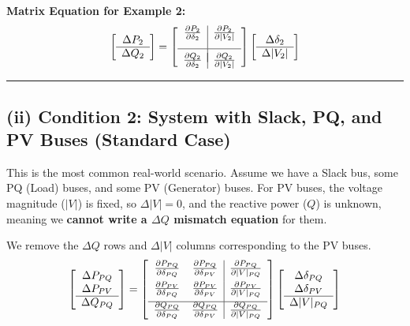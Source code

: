 \documentclass[11pt]{article}
\begin{document}
\textbf{Matrix Equation for Example 2:}
\begin{equation*}
    \left[ \begin{array}{c} 
    \Delta P_2 \\ \hline
    \Delta Q_2
    \end{array} \right] 
    = 
    \left[ \begin{array}{c | c} 
    \frac{\partial P_2}{\partial \delta_2} & \frac{\partial P_2}{\partial |V_2|} \\[0.3cm] \hline \\[-0.3cm]
    \frac{\partial Q_2}{\partial \delta_2} & \frac{\partial Q_2}{\partial |V_2|}
    \end{array} \right]
    \left[ \begin{array}{c} 
    \Delta \delta_2 \\ \hline
    \Delta |V_2|
    \end{array} \right]
\end{equation*}

\vspace{0.5cm}
\hrule

\subsection*{(ii) Condition 2: System with Slack, PQ, and PV Buses (Standard Case)}
This is the most common real-world scenario. Assume we have a Slack bus, some PQ (Load) buses, and some PV (Generator) buses. 
For PV buses, the voltage magnitude ($|V|$) is fixed, so $\Delta |V| = 0$, and the reactive power ($Q$) is unknown, meaning we \textbf{cannot write a $\Delta Q$ mismatch equation} for them.
%
\begin{stepbox}
We remove the $\Delta Q$ rows and $\Delta |V|$ columns corresponding to the PV buses.
\begin{equation*}
    \left[ \begin{array}{c} 
    \Delta P_{PQ} \\ \Delta P_{PV} \\ \hline
    \Delta Q_{PQ} 
    \end{array} \right] 
    = 
    \left[ \begin{array}{cc | c} 
    \frac{\partial P_{PQ}}{\partial \delta_{PQ}} & \frac{\partial P_{PQ}}{\partial \delta_{PV}} & \frac{\partial P_{PQ}}{\partial |V|_{PQ}} \\[0.2cm]
    \frac{\partial P_{PV}}{\partial \delta_{PQ}} & \frac{\partial P_{PV}}{\partial \delta_{PV}} & \frac{\partial P_{PV}}{\partial |V|_{PQ}} \\[0.2cm] \hline
    \frac{\partial Q_{PQ}}{\partial \delta_{PQ}} & \frac{\partial Q_{PQ}}{\partial \delta_{PV}} & \frac{\partial Q_{PQ}}{\partial |V|_{PQ}}
    \end{array} \right]
    \left[ \begin{array}{c} 
    \Delta \delta_{PQ} \\ \Delta \delta_{PV} \\ \hline
    \Delta |V|_{PQ} 
    \end{array} \right]
\end{equation*}
\end{stepbox}
\end{document}
